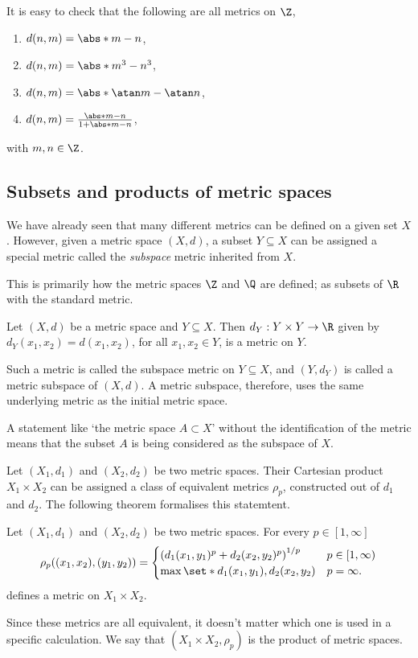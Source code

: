 \begin{negg}
  It is easy to check that the following are all metrics on $\Z$,
  \begin{enumerate}
  \item $d(n,m) = \abs*{m-n}$,
  \item $d(n,m) = \abs*{m^3 - n^3}$,
  \item $d(n,m) = \abs*{\atan m - \atan n}$,
  \item $d(n,m) = \frac{\abs*{m-n}}{1 + \abs*{m-n}}$,
  \end{enumerate}
  with $m,n \in \Z$. \eggqed
\end{negg}

\subsection{Subsets and products of metric spaces}
We have already seen that many different metrics can be defined on a given set $X$. However, given a metric space $(X,d)$, a subset $Y \subseteq X$ can be assigned a special metric called the \emph{subspace} metric inherited from $X$.

This is primarily how the metric spaces $\Z$ and $\Q$ are defined; as subsets of $\R$ with the standard metric.
\begin{nthm}
  Let $(X,d)$ be a metric space and $Y \subseteq X$. Then $d_Y : Y \times Y \to \R$ given by $d_{Y}(x_1, x_2) = d(x_1, x_2)$, for all $x_1, x_2 \in Y$, is a metric on $Y$.
\end{nthm}
Such a metric is called the subspace metric on $Y \subseteq X$, and $(Y, d_Y)$ is called a metric subspace of $(X,d)$. A metric subspace, therefore, uses the same underlying metric as the initial metric space.

\begin{remark}
  A statement like `the metric space $A \subset X$' without the identification of the metric means that the subset $A$ is being considered as the subspace of $X$.
\end{remark}

Let $(X_1, d_1)$ and $(X_2, d_2)$ be two metric spaces. Their Cartesian product $X_1 \times X_2$ can be assigned a class of equivalent metrics $\rho_p$, constructed out of $d_1$ and $d_2$. The following theorem formalises this statemtent.
\begin{nthm}
  Let $(X_1, d_1)$ and $(X_2, d_2)$ be two metric spaces. For every $p \in [1, \infty]$
  \begin{equation*}
    \rho_{p}((x_1, x_2), (y_1, y_2))
    = \begin{cases}
    \left(d_1(x_1, y_1)^{p} + d_2(x_2, y_2)^{p}\right)^{1/p} & p \in [1,\infty)\\
    \max\set*{d_1(x_1, y_1), d_2(x_2, y_2)} & p = \infty.
    \end{cases}
  \end{equation*}
  defines a metric on $X_1 \times X_2$.
\end{nthm}
Since these metrics are all equivalent, it doesn't matter which one is used in a specific calculation. We say that $(X_1 \times X_2, \rho_p)$ is the product of metric spaces.


